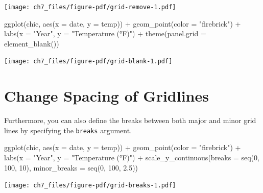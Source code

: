 \documentclass[
  letterpaper,
  DIV=11,
  numbers=noendperiod]{scrreprt}
\newenvironment{Shaded}{\begin{snugshade}}{\end{snugshade}}
\newcommand{\AttributeTok}[1]{\textcolor[rgb]{0.40,0.45,0.13}{#1}}
\newcommand{\DecValTok}[1]{\textcolor[rgb]{0.68,0.00,0.00}{#1}}
\newcommand{\FloatTok}[1]{\textcolor[rgb]{0.68,0.00,0.00}{#1}}
\newcommand{\FunctionTok}[1]{\textcolor[rgb]{0.28,0.35,0.67}{#1}}
\newcommand{\NormalTok}[1]{\textcolor[rgb]{0.00,0.23,0.31}{#1}}
\newcommand{\SpecialCharTok}[1]{\textcolor[rgb]{0.37,0.37,0.37}{#1}}
\newcommand{\StringTok}[1]{\textcolor[rgb]{0.13,0.47,0.30}{#1}}
\begin{document}
\texttt{[image: ch7\_files/figure-pdf/grid-remove-1.pdf]}

\begin{Shaded}
\begin{Highlighting}[]
\FunctionTok{ggplot}\NormalTok{(chic, }\FunctionTok{aes}\NormalTok{(}\AttributeTok{x =}\NormalTok{ date, }\AttributeTok{y =}\NormalTok{ temp)) }\SpecialCharTok{+}
  \FunctionTok{geom\_point}\NormalTok{(}\AttributeTok{color =} \StringTok{"firebrick"}\NormalTok{) }\SpecialCharTok{+}
  \FunctionTok{labs}\NormalTok{(}\AttributeTok{x =} \StringTok{"Year"}\NormalTok{, }\AttributeTok{y =} \StringTok{"Temperature (°F)"}\NormalTok{) }\SpecialCharTok{+}
  \FunctionTok{theme}\NormalTok{(}\AttributeTok{panel.grid =} \FunctionTok{element\_blank}\NormalTok{())}
\end{Highlighting}
\end{Shaded}

\texttt{[image: ch7\_files/figure-pdf/grid-blank-1.pdf]}

\section{Change Spacing of Gridlines}\label{change-spacing-of-gridlines}

Furthermore, you can also define the breaks between both major and minor
grid lines by specifying the \texttt{breaks} argument.

\begin{Shaded}
\begin{Highlighting}[]
\FunctionTok{ggplot}\NormalTok{(chic, }\FunctionTok{aes}\NormalTok{(}\AttributeTok{x =}\NormalTok{ date, }\AttributeTok{y =}\NormalTok{ temp)) }\SpecialCharTok{+}
  \FunctionTok{geom\_point}\NormalTok{(}\AttributeTok{color =} \StringTok{"firebrick"}\NormalTok{) }\SpecialCharTok{+}
  \FunctionTok{labs}\NormalTok{(}\AttributeTok{x =} \StringTok{"Year"}\NormalTok{, }\AttributeTok{y =} \StringTok{"Temperature (°F)"}\NormalTok{) }\SpecialCharTok{+}
  \FunctionTok{scale\_y\_continuous}\NormalTok{(}\AttributeTok{breaks =} \FunctionTok{seq}\NormalTok{(}\DecValTok{0}\NormalTok{, }\DecValTok{100}\NormalTok{, }\DecValTok{10}\NormalTok{),}
                     \AttributeTok{minor\_breaks =} \FunctionTok{seq}\NormalTok{(}\DecValTok{0}\NormalTok{, }\DecValTok{100}\NormalTok{, }\FloatTok{2.5}\NormalTok{))}
\end{Highlighting}
\end{Shaded}

\texttt{[image: ch7\_files/figure-pdf/grid-breaks-1.pdf]}
\end{document}
